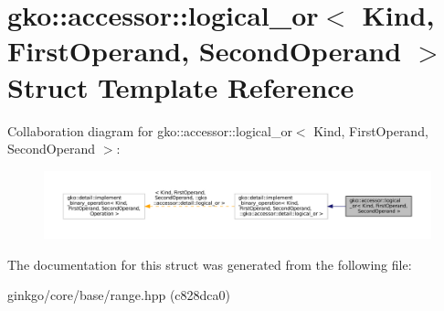 \hypertarget{structgko_1_1accessor_1_1logical__or}{}\section{gko\+:\+:accessor\+:\+:logical\+\_\+or$<$ Kind, First\+Operand, Second\+Operand $>$ Struct Template Reference}
\label{structgko_1_1accessor_1_1logical__or}


Collaboration diagram for gko\+:\+:accessor\+:\+:logical\+\_\+or$<$ Kind, First\+Operand, Second\+Operand $>$\+:
\nopagebreak
\begin{figure}[H]
\begin{center}
\leavevmode
\includegraphics[width=350pt]{structgko_1_1accessor_1_1logical__or__coll__graph}
\end{center}
\end{figure}


The documentation for this struct was generated from the following file\+:\begin{DoxyCompactItemize}
\item 
ginkgo/core/base/range.\+hpp (c828dca0)\end{DoxyCompactItemize}
